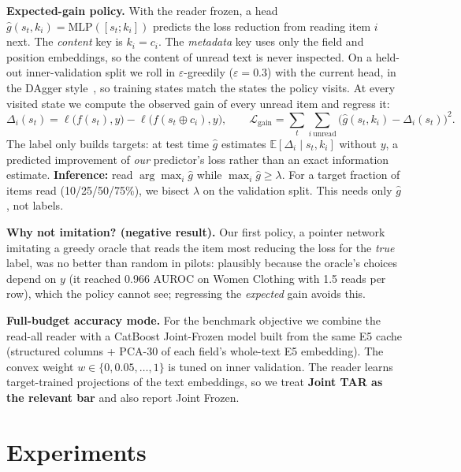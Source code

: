 \documentclass{article}
\begin{document}
\textbf{Expected-gain policy.}
With the reader frozen, a head $\hat g(s_t,k_i)=\mathrm{MLP}([s_t;k_i])$ predicts the loss reduction from reading item $i$ next.
The \emph{content} key is $k_i=c_i$.
The \emph{metadata} key uses only the field and position embeddings, so the content of unread text is never inspected.
On a held-out inner-validation split we roll in $\varepsilon$-greedily ($\varepsilon=0.3$) with the current head, in the DAgger style~\cite{ross2011dagger}, so training states match the states the policy visits.
At every visited state we compute the observed gain of every unread item and regress it:
\begin{equation}
\Delta_i(s_t)=\ell\big(f(s_t),y\big)-\ell\big(f(s_t\oplus c_i),y\big),\qquad
\mathcal{L}_{\text{gain}}=\textstyle\sum_{t}\sum_{i\ \text{unread}}\big(\hat g(s_t,k_i)-\Delta_i(s_t)\big)^2 .
\end{equation}
The label only builds targets: at test time $\hat g$ estimates $\mathbb{E}[\Delta_i\mid s_t,k_i]$ without $y$, a predicted improvement of \emph{our} predictor's loss rather than an exact information estimate.
\textbf{Inference:} read $\arg\max_i\hat g$ while $\max_i \hat g\ge\lambda$.
For a target fraction of items read (10/25/50/75\%), we bisect $\lambda$ on the validation split.
This needs only $\hat g$, not labels.

\textbf{Why not imitation? (negative result).}
Our first policy, a pointer network imitating a greedy oracle that reads the item most reducing the loss for the \emph{true} label, was no better than random in pilots: plausibly because the oracle's choices depend on $y$ (it reached 0.966 AUROC on Women Clothing with 1.5 reads per row), which the policy cannot see; regressing the \emph{expected} gain avoids this.

\textbf{Full-budget accuracy mode.}
For the benchmark objective we combine the read-all reader with a CatBoost Joint-Frozen model built from the same E5 cache (structured columns + PCA-30 of each field's whole-text E5 embedding).
The convex weight $w\in\{0,0.05,\dots,1\}$ is tuned on inner validation.
The reader learns target-trained projections of the text embeddings, so we treat \textbf{Joint TAR as the relevant bar} and also report Joint Frozen.

\section{Experiments}
\end{document}
